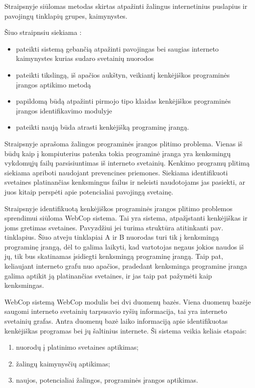 Straipsnyje  siūlomas  metodas skirtas atpažinti žalingus internetinius puslapius ir pavojingų tinklapių grupes, kaimynystes.

Šiuo straipnsiu siekiama \cite{webcop}:
    \begin{itemize}
        \item pateikti sistemą gebančią atpažinti pavojingas bei saugias interneto kaimynystes kurias sudaro svetainių nuorodos
         \item pateikti tikslingą, iš apačios aukštyn, veikiantį kenkėjiškos programinės įrangos aptikimo metodą
         \item papildomą būdą atpažinti pirmojo tipo klaidas kenkėjiškos programinės įrangos identifikavimo modulyje
         \item pateikti naują būda atrasti kenkėjišką programinę įrangą.
    \end{itemize}

Straipsnyje aprašoma žalingos programinės įrangos plitimo problema. Vienas iš būdų kaip į kompiuterius patenka  tokia programinė įranga yra kenksmingų vykdomųjų failų parsisiuntimas iš interneto svetainių. Kenkimo programų plitimą siekiama apriboti naudojant prevencines priemones. Siekiama identifikuoti svetaines platinančias kenksmingus failus ir neleisti naudotojams jas pasiekti, ar juos kitaip perspėti apie potencialiai pavojingą svetainę.

Straipsnyje identifikuotą kenkėjiškos programinės įrangos plitimo problemos sprendimui siūloma WebCop sistema. Tai yra sistema, atpažįstanti kenkėjiškas ir joms gretimas svetaines. Pavyzdžiui jei turima struktūra atitinkanti  pav. tinklapius. Šiuo atveju tinklapiai A ir B nuorodas turi tik į kenksmingą programinę įrangą, dėl to galima laikyti, kad vartotojas negaus jokios naudos iš jų, tik bus skatinamas įsidiegti kenksmingą programinę įrangą. Taip pat, keliaujant interneto grafu nuo apačios, pradedant kenksminga programine įranga galima aptikit ją platinančias svetaines, ir jas taip pat pažymėti kaip kenksmingas.


WebCop sistemą WebCop modulis bei dvi duomenų bazės. Viena duomenų bazėje saugomi interneto svetainių tarpusavio ryšių informacija, tai yra interneto svetainių grafas. Antra duomenų bazė laiko informaciją apie identifikuotas kenkėjiškas programas bei jų šaltinius internete. Ši sistema veikia keliais etapais:
    \begin{enumerate}[label=\arabic*.]
        \item nuorodų į platinimo svetaines aptikimas;
        \item žalingų kaimynysčių aptikimas;
        \item naujos, potencialiai žalingos, programinės įrangos aptikimas.
    \end{enumerate}

